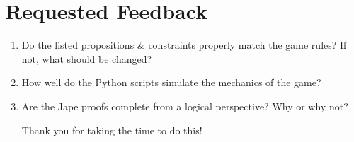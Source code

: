 \documentclass[pdftex,10pt,a4paper]{article}
\numberwithin{equation}{section} %
\begin{document}
\section*{Requested Feedback}
\begin{enumerate}
	\item Do the listed propositions \& constraints properly match the game rules? If not, what should be changed?
	
	\item How well do the Python scripts simulate the mechanics of the game?
	
	\item Are the Jape proofs complete from a logical perspective? Why or why not?\newline
	
	Thank you for taking the time to do this!
	
\end{enumerate}


\end{document}
